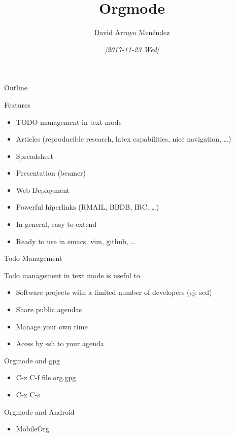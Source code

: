 \documentclass[bigger]{beamer}
\author{David Arroyo Menéndez}
\date{\textit{[2017-11-23 Wed]}}
\title{Orgmode}
\begin{document}
\maketitle
\begin{frame}{Outline}
\tableofcontents
\end{frame}


\begin{frame}[label=sec-1]{Features}
\begin{itemize}
\item TODO management in text mode
\item Articles (reproducible research, latex capabilities, nice navigation, \ldots{})
\item Spreadsheet
\item Presentation (beamer)
\item Web Deployment
\item Powerful hiperlinks (RMAIL, BBDB, IRC, \ldots{})
\item In general, easy to extend
\item Ready to use in emacs, vim, github, \ldots{}
\end{itemize}
\end{frame}

\begin{frame}[label=sec-2]{Todo Management}
\begin{block}{Todo management in text mode is useful to}
\begin{itemize}
\item Software projects with a limited number of developers (ej: sed)
\item Share public agendas
\item Manage your own time
\item Acess by ssh to your agenda
\end{itemize}
\end{block}

\begin{block}{Orgmode and gpg}
\begin{itemize}
\item C-x C-f file.org.gpg
\item C-x C-s
\end{itemize}
\end{block}

\begin{block}{Orgmode and Android}
\begin{itemize}
\item MobileOrg
\end{itemize}
\end{block}
\end{frame}
\end{document}
